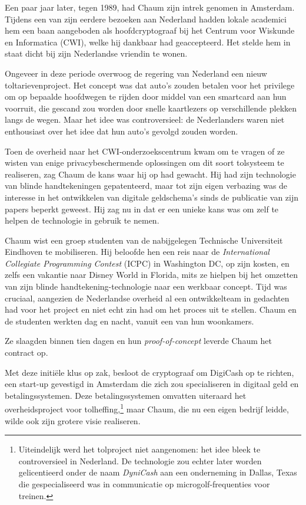 \documentclass[
  a5paper,
  smalldemyvopaper,11pt,twoside,onecolumn,openright,extrafontsizes,
hidelinks]{memoir}
\begin{document}
Een paar jaar later, tegen 1989, had Chaum zijn intrek genomen in
Amsterdam. Tijdens een van zijn eerdere bezoeken aan Nederland hadden
lokale academici hem een baan aangeboden als hoofdcryptograaf bij het
Centrum voor Wiskunde en Informatica (CWI), welke hij dankbaar had
geaccepteerd. Het stelde hem in staat dicht bij zijn Nederlandse
vriendin te wonen.

Ongeveer in deze periode overwoog de regering van Nederland een nieuw
toltarievenproject. Het concept was dat auto's zouden betalen voor het
privilege om op bepaalde hoofdwegen te rijden door middel van een
smartcard aan hun voorruit, die gescand zou worden door snelle
kaartlezers op verschillende plekken langs de wegen. Maar het idee was
controversieel: de Nederlanders waren niet enthousiast over het idee dat
hun auto's gevolgd zouden worden.

Toen de overheid naar het CWI-onderzoekscentrum kwam om te vragen of ze
wisten van enige privacybeschermende oplossingen om dit soort tolsysteem
te realiseren, zag Chaum de kans waar hij op had gewacht. Hij had zijn
technologie van blinde handtekeningen gepatenteerd, maar tot zijn eigen
verbazing was de interesse in het ontwikkelen van digitale geldschema's
sinds de publicatie van zijn papers beperkt geweest. Hij zag nu in dat
er een unieke kans was om zelf te helpen de technologie in gebruik te
nemen.

Chaum wist een groep studenten van de nabijgelegen Technische
Universiteit Eindhoven te mobiliseren. Hij beloofde hen een reis naar de
\emph{International Collegiate Programming Contest} (ICPC) in Washington
DC, op zijn kosten, en zelfs een vakantie naar Disney World in Florida,
mits ze hielpen bij het omzetten van zijn blinde
handtekening-technologie naar een werkbaar concept. Tijd was cruciaal,
aangezien de Nederlandse overheid al een ontwikkelteam in gedachten had
voor het project en niet echt zin had om het proces uit te stellen.
Chaum en de studenten werkten dag en nacht, vanuit een van hun
woonkamers.

Ze slaagden binnen tien dagen en hun \emph{proof-of-concept} leverde
Chaum het contract op.

Met deze initiële klus op zak, besloot de cryptograaf om DigiCash op te
richten, een start-up gevestigd in Amsterdam die zich zou specialiseren
in digitaal geld en betalingssystemen. Deze betalingssystemen omvatten
uiteraard het overheidsproject voor tolheffing,\footnote{Uiteindelijk
  werd het tolproject niet aangenomen: het idee bleek te controversieel
  in Nederland. De technologie zou echter later worden gelicentieerd
  onder de naam \emph{DyniCash} aan een onderneming in Dallas, Texas die
  gespecialiseerd was in communicatie op microgolf-frequenties voor
  treinen.} maar Chaum, die nu een eigen bedrijf leidde, wilde ook zijn
grotere visie realiseren.
\end{document}
